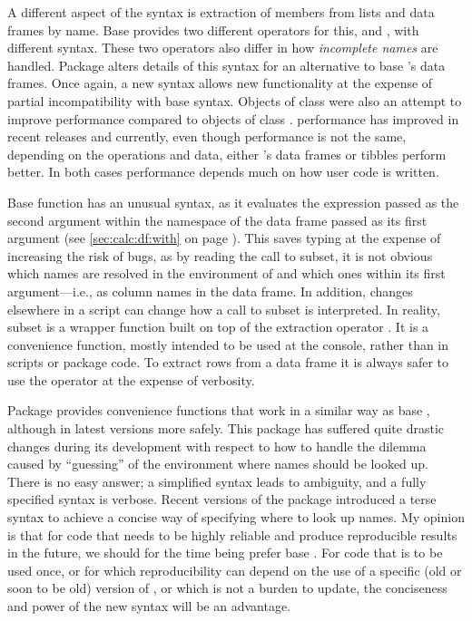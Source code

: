 \documentclass[krantz2]{krantz}\usepackage{knitr}
\begin{document}
A different aspect of the \Rlang syntax is extraction of members from lists and data frames by name. Base \Rlang provides two different operators for this, \code{\$} and \code{[[]]}, with different syntax. These two operators also differ in how \emph{incomplete names} are handled. Package  alters details of this syntax for an alternative to base \Rlang's data frames. Once again, a new syntax allows new functionality at the expense of partial incompatibility with base \Rlang syntax. Objects of class  were also an attempt to improve performance compared to objects of class . \Rlang performance has improved in recent releases and currently, even though performance is not the same, depending on the operations and data, either \Rlang's data frames or tibbles perform better. In both cases performance depends much on how user code is written.

Base \Rlang function  has an unusual syntax, as it evaluates the expression passed as the second argument within the namespace of the data frame passed as its first argument (see \ref{sec:calc:df:with} on page \pageref{sec:calc:df:with}). This saves typing at the expense of increasing the risk of bugs, as by reading the call to subset, it is not obvious which names are resolved in the environment of  and which ones within its first argument---i.e., as column names in the data frame. In addition, changes elsewhere in a script can change how a call to subset is interpreted. In reality, subset is a wrapper function built on top of the extraction operator \code{[]}. It is a convenience function, mostly intended to be used at the console, rather than in scripts or package code. To extract rows from a data frame it is always safer to use the \code{[ , ]} operator at the expense of verbosity.

Package  provides convenience functions that work in a similar way as base \Rlang {}, although in latest versions more safely. This package has suffered quite drastic changes during its development with respect to how to handle the dilemma caused by ``guessing'' of the environment where names should be looked up. There is no easy answer; a simplified syntax leads to ambiguity, and a fully specified syntax is verbose. Recent versions of the package introduced a terse syntax to achieve a concise way of specifying where to look up  names. My opinion is that for code that needs to be highly reliable and produce reproducible results in the future, we should for the time being prefer base \Rlang. For code that is to be used once, or for which reproducibility can depend on the use of a specific (old or soon to be old) version of , or which is not a burden to update, the conciseness and power of the new syntax will be an advantage.
\end{document}
